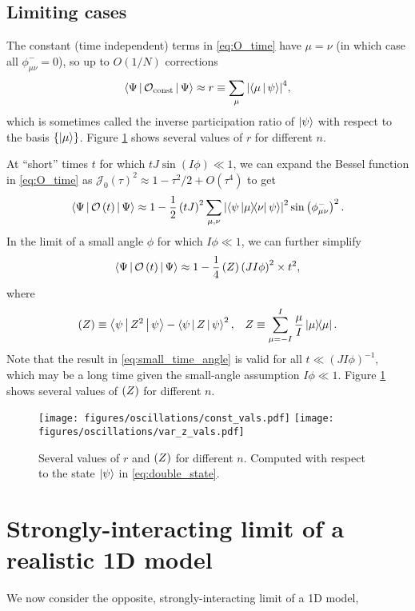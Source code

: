 \documentclass[nofootinbib,notitlepage,11pt]{revtex4-2}
\renewcommand{\t}{\text} %
\newcommand{\f}[2]{\dfrac{#1}{#2}} %
\newcommand{\p}[1]{\left(#1\right)} %
\renewcommand{\set}[1]{\left\{#1\right\}} %
\newcommand{\bk}{\Braket} %
\newcommand{\1}{\mathds{1}}
\newcommand{\J}{\mathcal{J}}
\renewcommand{\O}{\mathcal{O}}
\let\var\relax
\DeclareMathOperator{\var}{var}
\begin{document}
\subsection{Limiting cases}

The constant (time independent) terms in \eqref{eq:O_time} have
$\mu=\nu$ (in which case all $\phi_{\mu\nu}^-=0$), so up to $O(1/N)$
corrections
\begin{align}
  \bk{\Psi|\O_{\t{const}}|\Psi}
  \approx r \equiv \sum_\mu \abs{\bk{\mu|\psi}}^4,
  \label{eq:O_const}
\end{align}
which is sometimes called the inverse participation ratio of
$\ket\psi$ with respect to the basis $\set{\ket\mu}$.  Figure
\ref{fig:limiting_vals} shows several values of $r$ for different $n$.

At ``short'' times $t$ for which $tJ\sin\p{I\phi}\ll1$, we can expand
the Bessel function in \eqref{eq:O_time} as
$\J_0\p{\tau}^2\approx1-\tau^2/2+O\p{\tau^4}$ to get
\begin{align}
  \bk{\Psi|\O\p{t}|\Psi}
  \approx 1 - \f12 \p{tJ}^2 \sum_{\mu,\nu}
  \abs{\bk{\psi\op{\mu}{\nu}\psi}}^2 \sin\p{\phi_{\mu\nu}^-}^2.
\end{align}
In the limit of a small angle $\phi$ for which $I\phi\ll1$, we can
further simplify
\begin{align}
  \bk{\Psi|\O\p{t}|\Psi}
  \approx 1 - \f14 \var\p{Z} \p{JI\phi}^2 \times t^2,
  \label{eq:small_time_angle}
\end{align}
where
\begin{align}
  \var\p{Z} \equiv \bk{\psi|Z^2|\psi} - \bk{\psi|Z|\psi}^2,
  &&
  Z \equiv \sum_{\mu=-I}^I \f{\mu}{I} \op{\mu}.
\end{align}
Note that the result in \eqref{eq:small_time_angle} is valid for all
$t\ll\p{JI\phi}^{-1}$, which may be a long time given the small-angle
assumption $I\phi\ll1$.  Figure \ref{fig:limiting_vals} shows several
values of $\var\p{Z}$ for different $n$.

\begin{figure}
  \centering
  \texttt{[image: figures/oscillations/const\_vals.pdf]}
  \texttt{[image: figures/oscillations/var\_z\_vals.pdf]}
  \caption{Several values of $r$ and $\var\p{Z}$ for different $n$.
    Computed with respect to the state $\ket\psi$ in
    \eqref{eq:double_state}.}
  \label{fig:limiting_vals}
\end{figure}

\section{Strongly-interacting limit of a realistic 1D model}

We now consider the opposite, strongly-interacting limit of a 1D
model,
\end{document}
